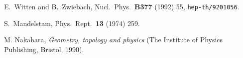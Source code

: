 \documentclass[a4paper,12pt]{article}
\begin{document}
\begin{thebibliography}{999}
E.~Witten and B.~Zwiebach,
Nucl.\ Phys.\  {\bf B377} (1992) 55,
{\tt hep-th/9201056}.

S.~Mandelstam,
Phys.\ Rept.\ {\bf 13} (1974) 259.

M. Nakahara, {\it Geometry, topology and physics}
(The Institute of Physics Publishing, Bristol, 1990).

\end{thebibliography}
\end{document}

